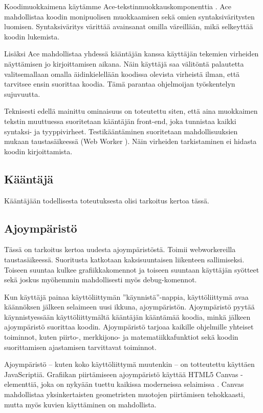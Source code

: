 Koodimuokkaimena käytämme Ace-tekstinmuokkauskomponenttia \cite{ace_about}.
Ace mahdollistaa koodin monipuolisen muokkaamisen
sekä omien syntaksiväritysten luomisen.
Syntaksiväritys värittää avainsanat omilla väreillään,
mikä selkeyttää koodin lukemista.

Lisäksi Ace mahdollistaa yhdessä kääntäjän kanssa käyttäjän tekemien virheiden näyttämisen jo kirjoittamisen aikana.
Näin käyttäjä saa välitöntä palautetta valitsemallaan omalla äidinkielellään koodissa olevista virheistä ilman,
että tarvitsee ensin suorittaa koodia.
Tämä parantaa ohjelmoijan työskentelyn sujuvuutta.

Teknisesti edellä mainittu ominaisuus on toteutettu siten,
että aina muokkaimen tekstin muuttuessa suoritetaan kääntäjän front-end,
joka tunnistaa kaikki syntaksi- ja tyyppivirheet.
Testikääntäminen suoritetaan mahdollisuuksien mukaan taustasäikeessä (Web Worker \cite{w3c_web_worker}).
Näin virheiden tarkistaminen ei hidasta koodin kirjoittamista.

\subsection{Kääntäjä}
\begin{anfxnote}{}
Kääntäjään todellisesta toteutuksesta olisi tarkoitus kertoa tässä.
\end{anfxnote}

\subsection{Ajoympäristö}
\begin{anfxnote}{}
Tässä on tarkoitus kertoa uudesta ajoympäristöstä.
Toimii webworkereilla taustasäikeessä.
Suoritusta katkotaan kaksisuuntaisen liikenteen sallimiseksi.
Toiseen suuntaa kulkee grafiikkakomennot ja toiseen suuntaan
käyttäjän syötteet sekä joskus myöhemmin mahdollisesti
myös debug-komennot.
\end{anfxnote}

Kun käyttäjä painaa käyttöliittymän ''käynnistä''-nappia,
käyttöliittymä avaa käännöksen jälkeen selaimeen uusi ikkuna,
ajoympäristön.
Ajoympäristö pyytää käynnistyessään käyttöliittymältä kääntäjän kääntämää koodia,
minkä jälkeen ajoympäristö suorittaa koodin.
Ajoympäristö tarjoaa kaikille ohjelmille yhteiset toiminnot,
kuten piirto-, merkkijono- ja matematiikkafunktiot
sekä koodin suorittamisen ajastamisen tarvittavat toiminnot.

Ajoympäristö -- kuten koko käyttöliittymä muutenkin --
on totteutettu käyttäen JavaScriptiä.
Grafiikan piirtämiseen ajoympäristö käyttää HTML5 Canvas -elementtiä,
joka on nykyään tuettu kaikissa moderneissa selaimissa
\cite{caniuse_canvas}.
Canvas mahdollistaa yksinkertaisten geometristen muotojen piirtämisen tehokkaasti,
mutta myös kuvien käyttäminen on mahdollista.

